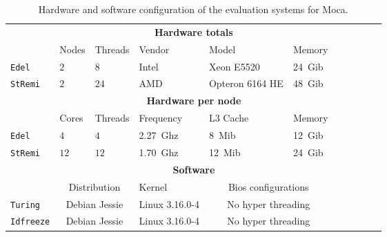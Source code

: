 \begin{table}[htb]
    \centering
    \begin{tabular}{lllllllllll}
        \toprule
        & \multicolumn{5}{c}{\textbf{Hardware totals}}\\
        \cmidrule(lr){2-6}
        & Nodes & Threads & Vendor & Model & Memory \\
        \cmidrule(lr){2-6}
        \texttt{Edel}    & $2$ & $8$  & Intel & Xeon E5520      & \SI{24}{Gib} \\
        \texttt{StRemi} & $2$ & $24$ & AMD   & Opteron 6164 HE & \SI{48}{Gib} \\
        \midrule
        & \multicolumn{5}{c}{\textbf{Hardware per node}}\\
        \cmidrule(lr){2-6}
        & Cores & Threads & Frequency & L3 Cache & Memory \\
        \cmidrule(lr){2-6}
        \texttt{Edel}   & $4$  & $4$   & \SI{2.27}{Ghz}& \SI{8}{Mib}  & \SI{12}{Gib} \\
        \texttt{StRemi} & $12$ & $12$  & \SI{1.70}{Ghz}& \SI{12}{Mib} & \SI{24}{Gib}\\
        \midrule
        & \multicolumn{5}{c}{\textbf{Software}}\\
        \cmidrule(lr){2-6}
        & \multicolumn{2}{c}{Distribution} & Kernel &
            \multicolumn{2}{c}{Bios configurations} \\
        \cmidrule(lr){2-6}
        \texttt{Turing}   & \multicolumn{2}{c}{Debian Jessie} & Linux 3.16.0-4 &
            \multicolumn{2}{c}{No hyper threading} \\
        \texttt{Idfreeze} & \multicolumn{2}{c}{Debian Jessie} & Linux 3.16.0-4 &
            \multicolumn{2}{c}{No hyper threading}\\
        \bottomrule
    \end{tabular}
    \caption{Hardware and software configuration of the evaluation systems for Moca.}
    \label{tab:hw-moca}
\end{table}

